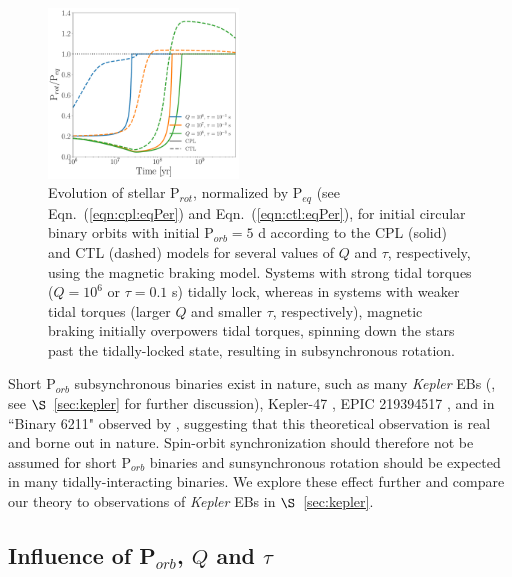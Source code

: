 \documentclass[twocolumn]{aastex61}
\newcommand{\kepler}[0]{\textit{Kepler}\xspace}
\begin{document}
\begin{figure}
	\includegraphics[width=0.45\textwidth]{../Plots/eqPerShortPorbMatt.pdf}
   \caption{Evolution of stellar P$_{rot}$, normalized by P$_{eq}$ (see Eqn.~(\ref{eqn:cpl:eqPer}) and Eqn.~(\ref{eqn:ctl:eqPer}), for initial circular binary orbits with initial P$_{orb} = 5$ d according to the CPL (solid) and CTL (dashed) models for several values of $Q$ and $\tau$, respectively, using the \citet{Matt2015} magnetic braking model. Systems with strong tidal torques ($Q = 10^6$ or $\tau = 0.1$ s) tidally lock, whereas in systems with weaker tidal torques (larger $Q$ and smaller $\tau$, respectively), magnetic braking initially overpowers tidal torques, spinning down the stars past the tidally-locked state, resulting in subsynchronous rotation. }%
    \label{fig:eqPerShortPorb}%
\end{figure}


Short P$_{orb}$ subsynchronous binaries exist in nature, such as many \kepler EBs (\citet{Lurie2017}, see $\S$~\ref{sec:kepler} for further discussion), Kepler-47 \citep{Orosz2012}, EPIC 219394517 \citep{Torres2018}, and in ``Binary 6211" observed by \citet{Meibom2006}, suggesting that this theoretical observation is real and borne out in nature. Spin-orbit synchronization should therefore not be assumed for short P$_{orb}$ binaries and sunsynchronous rotation should be expected in many tidally-interacting binaries.  We explore these effect further and compare our theory to observations of \kepler EBs in $\S$~\ref{sec:kepler}.

\subsection{Influence of P$_{orb}$, $Q$ and $\tau$} \label{sec:qTauMaps}
\end{document}
